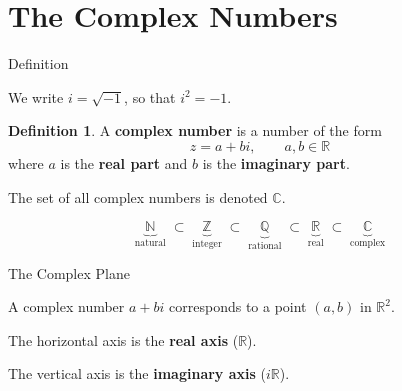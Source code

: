 \documentclass[10pt]{beamer}
\theoremstyle{definition}
\newtheorem{defi}{Definition}[section]
\newcommand{\x}[1]{\alert{\textbf{#1}}}
\begin{document}
\section{The Complex Numbers}


\begin{frame}{Definition}

We write $i = \sqrt{-1}$, so that $i^2 = -1$.

\vfill

\begin{defi}
A \x{complex number} is a number of the form
$$z = a + bi, \qquad a, b \in \mathbb{R}$$
where $a$ is the \x{real part} and $b$ is the \x{imaginary part}.
\end{defi}

\vfill

The set of all complex numbers is denoted $\mathbb{C}$.

\vfill\pause

$$\underbrace{\mathbb{N}}_{\text{natural}} \;\subset\; \underbrace{\mathbb{Z}}_{\text{integer}} \;\subset\; \underbrace{\mathbb{Q}}_{\text{rational}} \;\subset\; \underbrace{\mathbb{R}}_{\text{real}} \;\subset\; \underbrace{\mathbb{C}}_{\text{complex}}$$

\end{frame}


\begin{frame}[shrink=3]{The Complex Plane}

A complex number $a + bi$ corresponds to a point $(a, b)$ in $\mathbb{R}^2$.

\vfill

\begin{center}
\end{center}

\vfill

The horizontal axis is the \x{real axis} ($\mathbb{R}$).

The vertical axis is the \x{imaginary axis} ($i\mathbb{R}$).

\end{frame}
\end{document}
